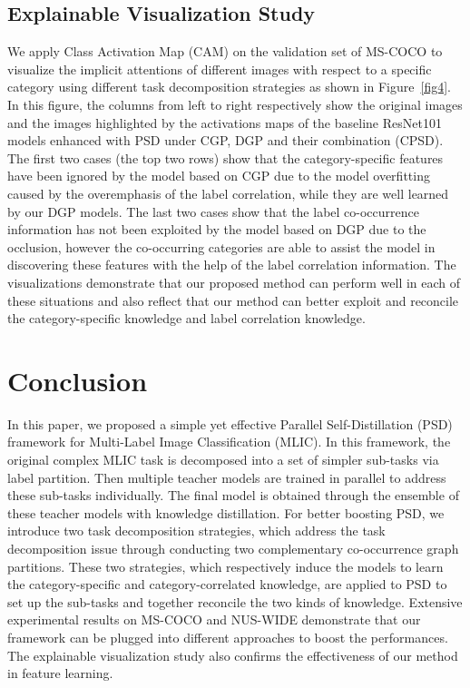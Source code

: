 \documentclass{article}
\begin{document}
\subsection{Explainable Visualization Study}
We apply Class Activation Map (CAM) on the validation set of MS-COCO to visualize the implicit attentions of different images with respect to a specific category using different task decomposition strategies as shown in Figure~\ref{fig4}.
In this figure, the columns from left to right respectively show the original images and the images highlighted by the activations maps of the baseline ResNet101 models enhanced with PSD under CGP, DGP and their combination (CPSD).
The first two cases (the top two rows) show that the category-specific features have been ignored by the model based on CGP due to the model overfitting caused by the overemphasis of the label correlation, while they are well learned by our DGP models.
The last two cases show that the label co-occurrence information has not been exploited by the model based on DGP due to the occlusion, however the co-occurring categories are able to assist the model in discovering these features with the help of the label correlation information.
The visualizations demonstrate that our proposed method can perform well in each of these situations and also reflect that our method can better exploit and reconcile the category-specific knowledge and label correlation knowledge.

\vspace{-0.2cm}
\section{Conclusion}
\vspace{-0.05cm}
In this paper, we proposed a simple yet effective Parallel Self-Distillation (PSD) framework for Multi-Label Image Classification (MLIC). In this framework, the original complex MLIC task is decomposed into a set of simpler sub-tasks via label partition. Then multiple teacher models are trained in parallel to address these sub-tasks individually. The final model is obtained through the ensemble of these teacher models with knowledge distillation. For better boosting PSD, we introduce two task decomposition strategies, which address the task decomposition issue through conducting two complementary co-occurrence graph partitions. These two strategies, which respectively induce the models to learn the category-specific and category-correlated knowledge, are applied to PSD to set up the sub-tasks and together reconcile the two kinds of knowledge. Extensive experimental results on MS-COCO and NUS-WIDE demonstrate that our framework can be plugged into different approaches to boost the performances. The explainable visualization study also confirms the effectiveness of our method in feature learning.
\end{document}
